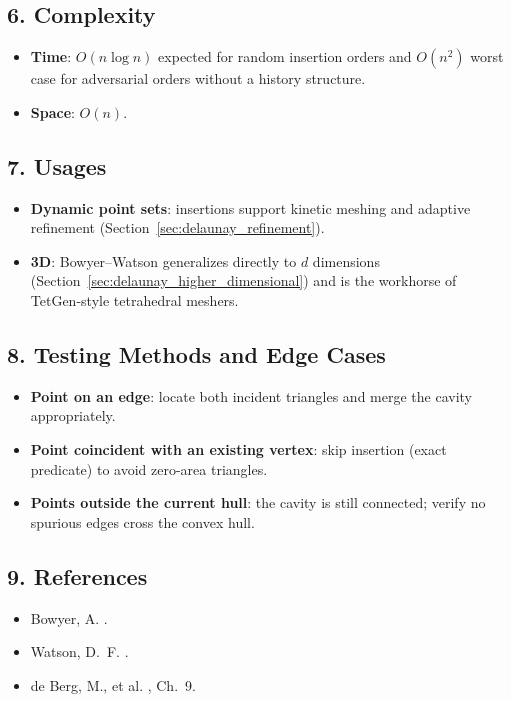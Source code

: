\subsection{6. Complexity}

\begin{itemize}
\item \textbf{Time}: $O(n \log n)$ expected for random insertion orders and
  $O(n^2)$ worst case for adversarial orders without a history structure.
\item \textbf{Space}: $O(n)$.
\end{itemize}

\subsection{7. Usages}

\begin{itemize}
\item \textbf{Dynamic point sets}: insertions support kinetic meshing and
  adaptive refinement (Section~\ref{sec:delaunay_refinement}).
\item \textbf{3D}: Bowyer--Watson generalizes directly to $d$ dimensions
  (Section~\ref{sec:delaunay_higher_dimensional}) and is the workhorse of
  TetGen-style tetrahedral meshers.
\end{itemize}

\subsection{8. Testing Methods and Edge Cases}

\begin{itemize}
\item \textbf{Point on an edge}: locate both incident triangles and merge the
  cavity appropriately.
\item \textbf{Point coincident with an existing vertex}: skip insertion
  (exact predicate) to avoid zero-area triangles.
\item \textbf{Points outside the current hull}: the cavity is still connected;
  verify no spurious edges cross the convex hull.
\end{itemize}

\subsection{9. References}

\begin{itemize}
\item Bowyer, A. \cite{bowyer1981}.
\item Watson, D.~F. \cite{watson1981}.
\item de Berg, M., et al. \cite{deberg2008}, Ch.~9.
\end{itemize}

